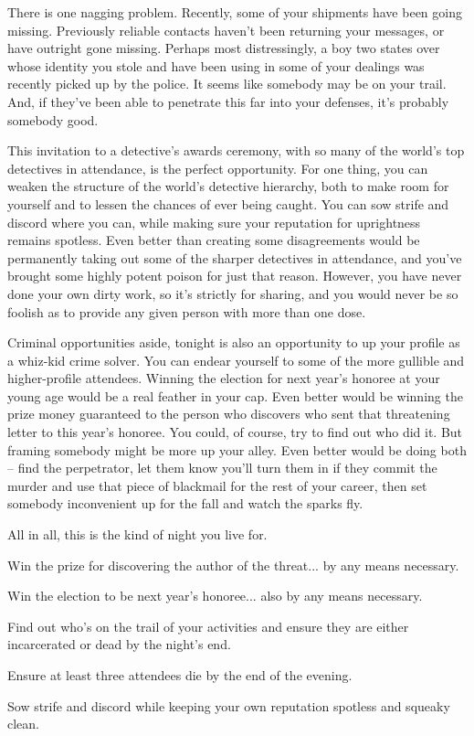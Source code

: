 \documentclass[char]{guildcamp4}
\begin{document}
There is one nagging problem. Recently, some of your shipments have been going missing. Previously reliable contacts haven't been returning your messages, or have outright gone missing. Perhaps most distressingly, a boy two states over whose identity you stole and have been using in some of your dealings was recently picked up by the police. It seems like somebody may be on your trail. And, if they've been able to penetrate this far into your defenses, it's probably somebody good.

This invitation to a detective's awards ceremony, with so many of the world's top detectives in attendance, is the perfect opportunity. For one thing, you can weaken the structure of the world's detective hierarchy, both to make room for yourself and to lessen the chances of ever being caught. You can sow strife and discord where you can, while making sure your reputation for uprightness remains spotless. Even better than creating some disagreements would be permanently taking out some of the sharper detectives in attendance, and you've brought some highly potent poison for just that reason. However, you have never done your own dirty work, so it's strictly for sharing, and you would never be so foolish as to provide any given person with more than one dose.

Criminal opportunities aside, tonight is also an opportunity to up your profile as a whiz-kid crime solver. You can endear yourself to some of the more gullible and higher-profile attendees. Winning the election for next year's honoree at your young age would be a real feather in your cap. Even better would be winning the prize money guaranteed to the person who discovers who sent that threatening letter to this year's honoree. You could, of course, try to find out who did it. But framing somebody might be more up your alley. Even better would be doing both -- find the perpetrator, let them know you'll turn them in if they commit the murder and use that piece of blackmail for the rest of your career, then set somebody inconvenient up for the fall and watch the sparks fly.

All in all, this is the kind of night you live for. 

\begin{itemz}[Goals]
	\item Win the prize for discovering the author of the threat... by any means necessary.
	\item Win the election to be next year's honoree... also by any means necessary.
	\item Find out who's on the trail of your activities and ensure they are either incarcerated or dead by the night's end.
	\item Ensure at least three attendees die by the end of the evening.
	\item Sow strife and discord while keeping your own reputation spotless and squeaky clean.
\end{itemz} 
\end{document}
